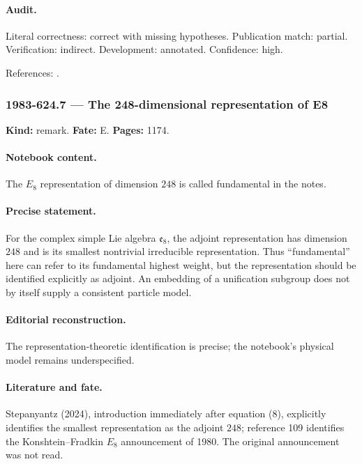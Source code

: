 \paragraph{Audit.} Literal correctness: correct with missing hypotheses. Publication match: partial. Verification: indirect. Development: annotated. Confidence: high.

\noindent References: \citep{vannieuwenhuizen1981supergravity}.\par

\subsubsection{1983-624.7 --- The 248-dimensional representation of E8}

\label{item:1983-624.7}

\noindent\textbf{Kind:} remark. \textbf{Fate:} E. \textbf{Pages:} 1174.\par

\paragraph{Notebook content.} The \(E_8\) representation of dimension \(248\) is called fundamental in the notes.

\paragraph{Precise statement.} For the complex simple Lie algebra \(\mathfrak e_8\), the adjoint representation has dimension \(248\) and is its smallest nontrivial irreducible representation. Thus “fundamental” here can refer to its fundamental highest weight, but the representation should be identified explicitly as adjoint. An embedding of a unification subgroup does not by itself supply a consistent particle model.

\paragraph{Editorial reconstruction.} The representation-theoretic identification is precise; the notebook’s physical model remains underspecified.

\paragraph{Literature and fate.} Stepanyantz (2024), introduction immediately after equation (8), explicitly identifies the smallest representation as the adjoint \(248\); reference 109 identifies the Konshtein–Fradkin \(E_8\) announcement of 1980. The original announcement was not read.

